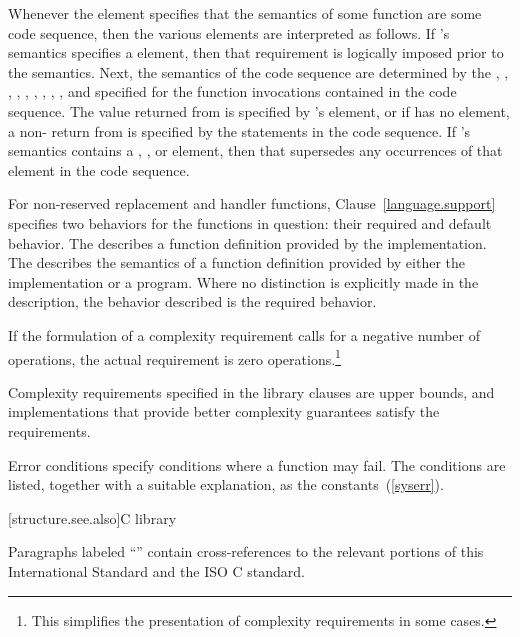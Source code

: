 \pnum
Whenever the \effects element specifies that the semantics of some function
 are  some code sequence, then the various elements are
interpreted as follows. If 's semantics specifies a \requires element, then
that requirement is logically imposed prior to the  semantics.
Next, the semantics of the code sequence are determined by the \requires, \effects,
\sync, \postconditions, \returns, \throws, \complexity, \remarks, \errors, and \realnotes
specified for the function invocations contained in the code sequence. The value
returned from  is specified by 's \returns element, or if 
has no \returns element, a non- return from  is specified by the
 statements in the code sequence.
If 's semantics contains a \throws,
\postconditions, or \complexity element, then that supersedes any occurrences of that
element in the code sequence.

\pnum
For non-reserved replacement and handler functions,
Clause~\ref{language.support} specifies two behaviors for the functions in question:
their required and default behavior.
The
describes a function definition provided by the implementation.
%
The
describes the semantics of a function definition provided by
%
either the implementation or a \Cpp program.
Where no distinction is explicitly made in the description, the
behavior described is the required behavior.

\pnum
If the formulation of a complexity requirement calls for a negative number of
operations, the actual requirement is zero operations.\footnote{This simplifies
the presentation of complexity requirements in some cases.}

\pnum
Complexity requirements specified in the library clauses are upper bounds,
and implementations that provide better complexity guarantees satisfy
the requirements.

\pnum
Error conditions specify conditions where a function may fail. The conditions
are listed, together with a suitable explanation, as the 
constants~(\ref{syserr}).

[structure.see.also]{C library}

\pnum
Paragraphs labeled ``\xref'' contain cross-references to the relevant portions
of this International Standard and the ISO C standard.

